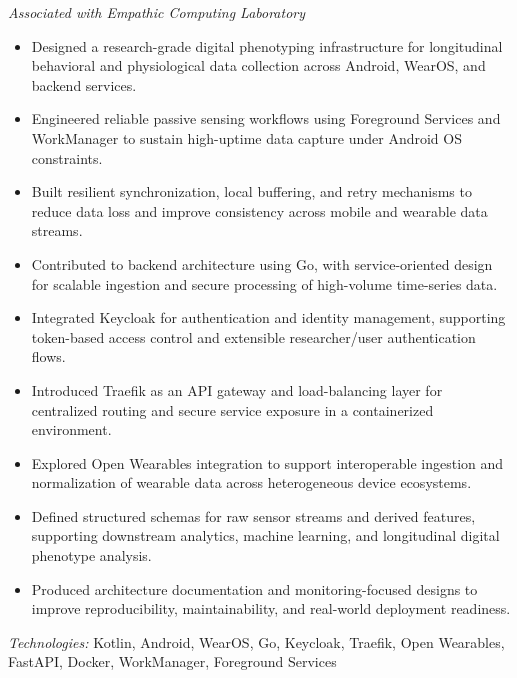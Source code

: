 \noindent
{}

\noindent
\textit{Associated with Empathic Computing Laboratory}

\begin{itemize}
    \item Designed a research-grade digital phenotyping infrastructure for longitudinal behavioral and physiological data collection across Android, WearOS, and backend services.

    \item Engineered reliable passive sensing workflows using Foreground Services and WorkManager to sustain high-uptime data capture under Android OS constraints.

    \item Built resilient synchronization, local buffering, and retry mechanisms to reduce data loss and improve consistency across mobile and wearable data streams.

    \item Contributed to backend architecture using Go, with service-oriented design for scalable ingestion and secure processing of high-volume time-series data.

    \item Integrated Keycloak for authentication and identity management, supporting token-based access control and extensible researcher/user authentication flows.

    \item Introduced Traefik as an API gateway and load-balancing layer for centralized routing and secure service exposure in a containerized environment.

    \item Explored Open Wearables integration to support interoperable ingestion and normalization of wearable data across heterogeneous device ecosystems.

    \item Defined structured schemas for raw sensor streams and derived features, supporting downstream analytics, machine learning, and longitudinal digital phenotype analysis.

    \item Produced architecture documentation and monitoring-focused designs to improve reproducibility, maintainability, and real-world deployment readiness.
\end{itemize}

\noindent
\textit{Technologies:} Kotlin, Android, WearOS, Go, Keycloak, Traefik, Open Wearables, FastAPI, Docker, WorkManager, Foreground Services
